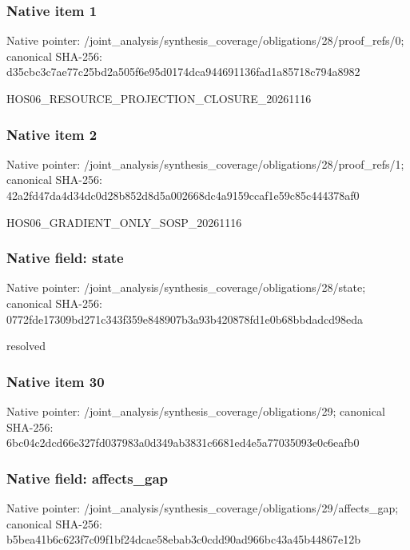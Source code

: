 \documentclass[10pt,a4paper]{article}
\begin{document}
\subsubsection{Native item 1}
Native pointer: /joint\_\allowbreak{}analysis/synthesis\_\allowbreak{}coverage/obligations/28/proof\_\allowbreak{}refs/0; canonical SHA-256: d35cbc3c7ae77c25bd2a505f6e95d0174dca944691136fad1a85718c794a8982

\begingroup\raggedright\sloppy HOS06\_\allowbreak{}RESOURCE\_\allowbreak{}PROJECTION\_\allowbreak{}CLOSURE\_\allowbreak{}20261116\par\endgroup

\subsubsection{Native item 2}
Native pointer: /joint\_\allowbreak{}analysis/synthesis\_\allowbreak{}coverage/obligations/28/proof\_\allowbreak{}refs/1; canonical SHA-256: 42a2fd47da4d34dc0d28b852d8d5a002668dc4a9159ccaf1e59c85c444378af0

\begingroup\raggedright\sloppy HOS06\_\allowbreak{}GRADIENT\_\allowbreak{}ONLY\_\allowbreak{}SOSP\_\allowbreak{}20261116\par\endgroup

\subsubsection{Native field: state}
Native pointer: /joint\_\allowbreak{}analysis/synthesis\_\allowbreak{}coverage/obligations/28/state; canonical SHA-256: 0772fde17309bd271c343f359e848907b3a93b420878fd1e0b68bbdadcd98eda

\begingroup\raggedright\sloppy resolved\par\endgroup

\subsubsection{Native item 30}
Native pointer: /joint\_\allowbreak{}analysis/synthesis\_\allowbreak{}coverage/obligations/29; canonical SHA-256: 6bc04c2dcd66e327fd037983a0d349ab3831c6681ed4e5a77035093e0c6eafb0

\subsubsection{Native field: affects\_\allowbreak{}gap}
Native pointer: /joint\_\allowbreak{}analysis/synthesis\_\allowbreak{}coverage/obligations/29/affects\_\allowbreak{}gap; canonical SHA-256: b5bea41b6c623f7c09f1bf24dcae58ebab3c0cdd90ad966bc43a45b44867e12b
\end{document}
